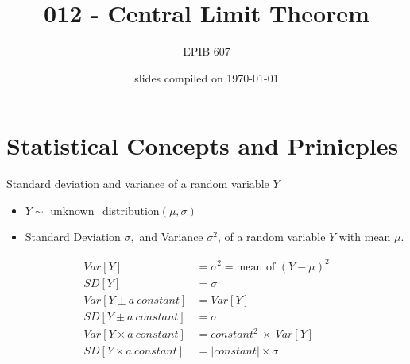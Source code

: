 \documentclass[10pt,handout]{beamer}\usepackage[]{graphicx}\usepackage[]{color}
\begin{document}
	
	
	
	
	\title{012 - Central Limit Theorem}
	\author{EPIB 607}
	
	\date{slides compiled on \today}
	
	\maketitle

\section{Statistical Concepts and Prinicples}


\begin{frame}{Standard deviation and variance of a random variable $Y$}
	\begin{itemize}
		\tightlist
		\item $Y \sim$ unknown\_distribution$(\mu, \sigma)$
		\item Standard Deviation \(\sigma,\) and Variance \(\sigma^2\), of a random variable \(Y\) with mean \(\mu\).
	\end{itemize}

\begin{align*}
Var[Y] &= \sigma^2 = \textrm{mean of } (Y - \mu)^2 \\
SD[Y] &= \sigma \\
Var[Y \pm a \ constant] &= Var[Y] \\
SD[Y \pm a \ constant] &= \sigma \\
Var[Y \times a \ constant] &= constant^2 \ \times \ Var[Y] \\
SD[Y \times a \ constant] &= |constant| \times \sigma
\end{align*}	


\end{frame}
\end{document}
